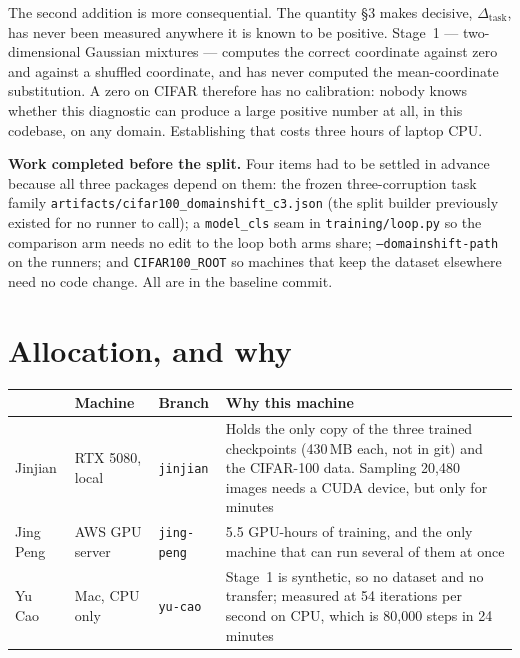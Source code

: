 \documentclass[11pt]{article}
\newcommand{\code}[1]{\texttt{\small #1}}
\newcommand{\dtask}{\Delta_{\mathrm{task}}}
\begin{document}
The second addition is more consequential. The quantity \S3 makes decisive, $\dtask$, has
never been measured anywhere it is known to be positive. Stage~1 --- two-dimensional
Gaussian mixtures --- computes the correct coordinate against zero and against a shuffled
coordinate, and has never computed the mean-coordinate substitution. A zero on CIFAR
therefore has no calibration: nobody knows whether this diagnostic can produce a large
positive number at all, in this codebase, on any domain. Establishing that costs three
hours of laptop CPU.

\vspace{0.4em}
\noindent\textbf{Work completed before the split.}
Four items had to be settled in advance because all three packages depend on them: the
frozen three-corruption task family \code{artifacts/cifar100\_domainshift\_c3.json}
(the split builder previously existed for no runner to call); a \code{model\_cls} seam in
\code{training/loop.py} so the comparison arm needs no edit to the loop both arms share;
\code{--domainshift-path} on the runners; and \code{CIFAR100\_ROOT} so machines that keep
the dataset elsewhere need no code change. All are in the baseline commit.

\section{Allocation, and why}

\noindent
\begin{tabularx}{\textwidth}{@{}l l l X@{}}
\toprule
& \textbf{Machine} & \textbf{Branch} & \textbf{Why this machine} \\
\midrule
Jinjian & RTX 5080, local & \code{jinjian} &
  Holds the only copy of the three trained checkpoints (430\,MB each, not in git) and
  the CIFAR-100 data. Sampling 20{,}480 images needs a CUDA device, but only for minutes \\
\addlinespace[3pt]
Jing Peng & AWS GPU server & \code{jing-peng} &
  5.5 GPU-hours of training, and the only machine that can run several of them at once \\
\addlinespace[3pt]
Yu Cao & Mac, CPU only & \code{yu-cao} &
  Stage~1 is synthetic, so no dataset and no transfer; measured at 54 iterations per
  second on CPU, which is 80{,}000 steps in 24 minutes \\
\bottomrule
\end{tabularx}
\end{document}
